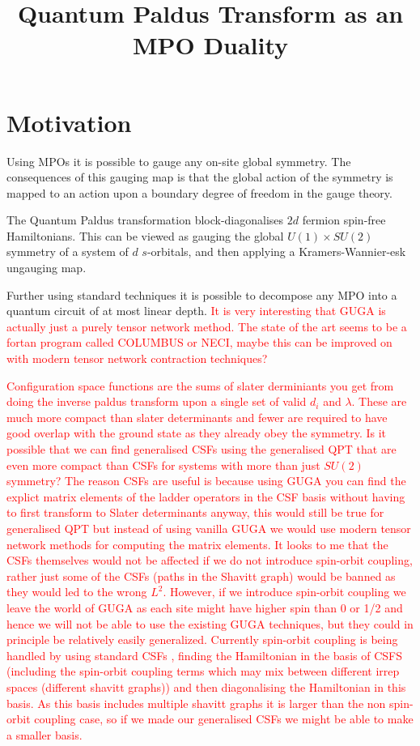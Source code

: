 \documentclass[aps,prx,twocolumn,floatfix,10pt,amssymb,amsfont,amsmath,superscriptaddress,float,nofootinbib,longbibliography,nobalancelastpage]{revtex4-2}
\begin{document}
\title{Quantum Paldus Transform as an MPO Duality}

\maketitle

\section{Motivation}
Using MPOs it is possible to gauge any on-site global symmetry. The consequences of this gauging map is that the global action of the symmetry is mapped to an action upon a boundary degree of freedom in the gauge theory.

The Quantum Paldus transformation \cite{burkat2025quantum} block-diagonalises $2d$ fermion spin-free Hamiltonians. This can be viewed as gauging the global $U(1) \times SU(2)$ symmetry of a system of $d$ $s$-orbitals, and then applying a Kramers-Wannier-esk ungauging map.

Further using standard techniques it is possible to decompose any MPO into a quantum circuit of at most linear depth.
\textcolor{red}{It is very interesting that GUGA is actually just a purely tensor network method. The state of the art seems to be a fortan program called COLUMBUS or NECI, maybe this can be improved on with modern tensor network contraction techniques?}

\textcolor{red}{Configuration space functions are the sums of slater derminiants you get from doing the inverse paldus transform upon a single set of valid $d_i$ and $\lambda$. These are much more compact than slater determinants and fewer are required to have good overlap with the ground state as they already obey the symmetry. Is it possible that we can find generalised CSFs using the generalised QPT that are even more compact than CSFs for systems with more than just $SU(2)$ symmetry? The reason CSFs are useful is because using GUGA you can find the explict matrix elements of the ladder operators in the CSF basis without having to first transform to Slater determinants anyway, this would still be true for generalised QPT but instead of using vanilla GUGA we would use modern tensor network methods for computing the matrix elements. It looks to me that the CSFs themselves would not be affected if we do not introduce spin-orbit coupling, rather just some of the CSFs (paths in the Shavitt graph) would be banned as they would led to the wrong $L^2$. However, if we introduce spin-orbit coupling we leave the world of GUGA as each site might have higher spin than 0 or 1/2 and hence we will not be able to use the existing GUGA techniques, but they could in principle be relatively easily generalized. Currently spin-orbit coupling is being handled by using standard CSFs \cite{wen1994explicit,yabushita1999spin}, finding the Hamiltonian in the basis of CSFS (including the spin-orbit coupling terms which may mix between different irrep spaces (different shavitt graphs)) and then diagonalising the Hamiltonian in this basis. As this basis includes multiple shavitt graphs it is larger than the non spin-orbit coupling case, so if we made our generalised CSFs we might be able to make a smaller basis.}
\end{document}
